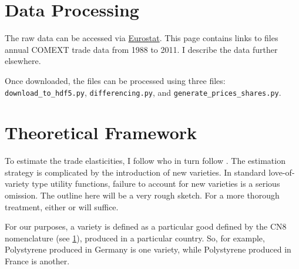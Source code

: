 \documentclass[12pt,a4paper,hidelinks]{article}            %
\begin{document}



\section{Data Processing}
\label{sec:data_processing}

The raw data can be accessed via \href{http://epp.eurostat.ec.europa.eu/NavTree\_prod/everybody/BulkDownloadListing?sort=1\&dir=comext%2F2012S2%2Fdata}{Eurostat}.  This page contains links to files annual COMEXT trade data from 1988 to 2011.  I describe the data further elsewhere.

Once downloaded, the files can be processed using three files: \texttt{download\_to\_hdf5.py}, \texttt{differencing.py}, and \texttt{generate\_prices\_shares.py}.

\section{Theoretical Framework}
\label{sec:theoretical_framework}

To estimate the trade elasticities, I follow \cite{broda_weinstein_2006_globalization_gains} who in turn follow \cite{feenstra_1994_new_product_varieties}.  The estimation strategy is complicated by the introduction of new varieties.  In standard love-of-variety type utility functions, failure to account for new varieties is a serious omission.  The outline here will be a very rough sketch.  For a more thorough treatment, either \cite{feenstra_1994_new_product_varieties} or \cite{broda_weinstein_2006_globalization_gains} will suffice.

For our purposes, a variety is defined as a particular good defined by the CN8 nomenclature (see \ref{sec:data_processing}), produced in a particular country.  So, for example, Polystyrene produced in Germany is one variety, while Polystyrene produced in France is another.
\end{document}
